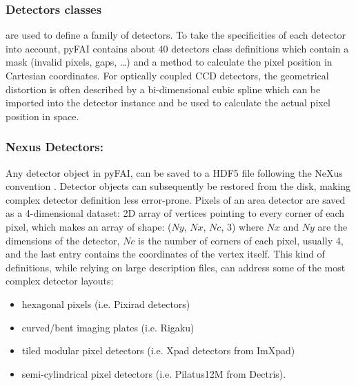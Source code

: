 \documentclass[preprint]{iucr}
\begin{document}
\subsubsection{Detectors classes} are used to define a family of detectors.
To take the specificities of each detector into account, pyFAI contains about
40 detectors class definitions which contain a mask (invalid pixels,
gaps, \ldots) and a method to calculate the pixel position in Cartesian coordinates.
For optically coupled CCD detectors, the geometrical distortion is often
described by a bi-dimensional cubic spline which can be imported into
the detector instance and be used to calculate the actual pixel position in space.

\subsubsection{Nexus Detectors:}
Any detector object in pyFAI, can be saved to a HDF5 file following the NeXus
 convention \cite{nexus}.
Detector objects can subsequently be restored from the disk, making
complex detector definition less error-prone.
Pixels of an area detector are saved as a 4-dimensional dataset: 2D
array of vertices pointing to every corner of each pixel, which makes an array
of shape: ($Ny$, $Nx$, $Nc$, 3) where $Nx$ and $Ny$ are the dimensions of the
detector, $Nc$ is the number of corners of each pixel, usually 4, and the last
entry contains the coordinates of the vertex itself.
This kind of definitions, while relying on large description files,
can address some of the most complex detector layouts:
\begin{itemize}
  \item hexagonal pixels (i.e. Pixirad detectors)
  \item curved/bent imaging plates (i.e. Rigaku)
  \item tiled modular pixel detectors (i.e. Xpad detectors from ImXpad)
  \item semi-cylindrical pixel detectors (i.e. Pilatus12M from Dectris).
\end{itemize}
\end{document}
